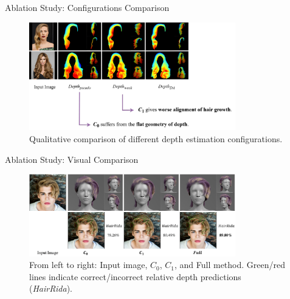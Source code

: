 \begin{frame}{Ablation Study: Configurations Comparison}
    \begin{figure}
        \centering
        \includegraphics[width=0.8\textwidth]{assets/figures/eval/ablation/depth-comparison.png}
        \caption{Qualitative comparison of different depth estimation configurations.}
    \end{figure}
\end{frame}

\begin{frame}{Ablation Study: Visual Comparison}
    \begin{figure}
        \centering
        \includegraphics[width=0.8\textwidth]{assets/figures/eval/ablation/sample-1.png}
        \caption{From left to right: Input image, $C_0$, $C_1$, and Full method. Green/red lines indicate correct/incorrect relative depth predictions (\emph{HairRida}).}
    \end{figure}
\end{frame}
